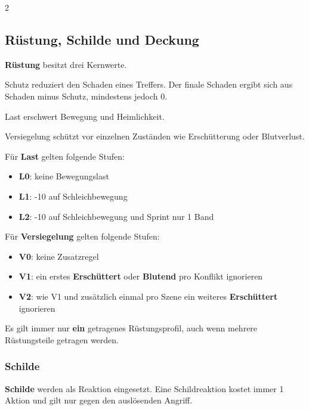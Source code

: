 \begin{multicols*}{2}
\subsection{Rüstung, Schilde und Deckung}\label{sec:rustung}

\textbf{Rüstung} besitzt drei Kernwerte.

\begin{description}[style=nextline,leftmargin=0pt]
\item[\textbf{Schutz}] Schutz reduziert den Schaden eines Treffers. Der finale Schaden ergibt sich aus Schaden minus Schutz, mindestens jedoch 0.
\item[\textbf{Last}] Last erschwert Bewegung und Heimlichkeit.
\item[\textbf{Versiegelung}] Versiegelung schützt vor einzelnen Zuständen wie Erschütterung oder Blutverlust.
\end{description}

Für \textbf{Last} gelten folgende Stufen:

\begin{itemize}[leftmargin=*]
\item \textbf{L0}: keine Bewegungslast
\item \textbf{L1}: -10 auf Schleichbewegung
\item \textbf{L2}: -10 auf Schleichbewegung und Sprint nur 1 Band
\end{itemize}

Für \textbf{Versiegelung} gelten folgende Stufen:

\begin{itemize}[leftmargin=*]
\item \textbf{V0}: keine Zusatzregel
\item \textbf{V1}: ein erstes \textbf{Erschüttert} oder \textbf{Blutend} pro Konflikt ignorieren
\item \textbf{V2}: wie V1 und zusätzlich einmal pro Szene ein weiteres \textbf{Erschüttert} ignorieren
\end{itemize}

Es gilt immer nur \textbf{ein} getragenes Rüstungsprofil, auch wenn mehrere Rüstungsteile getragen werden.

\subsubsection{Schilde}\label{sec:schilde}

\textbf{Schilde} werden als Reaktion eingesetzt.
Eine Schildreaktion kostet immer 1 Aktion und gilt nur gegen den auslösenden Angriff.


\end{multicols*}
